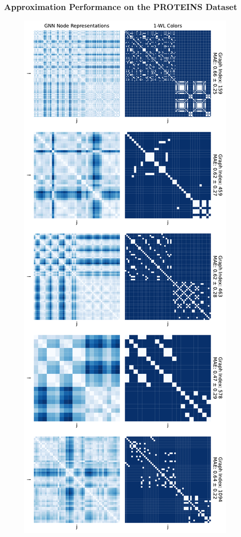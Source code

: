 \subsubsection{Approximation Performance on the PROTEINS Dataset}
\begin{figure}[H]
    \centering
    \begin{minipage}[b]{0.45992852703\textwidth}
        \centering
        \includegraphics[width=\textwidth, left]{Figures/heatmaps_PROTEINS_0.pdf}

\end{minipage}
\end{figure}
